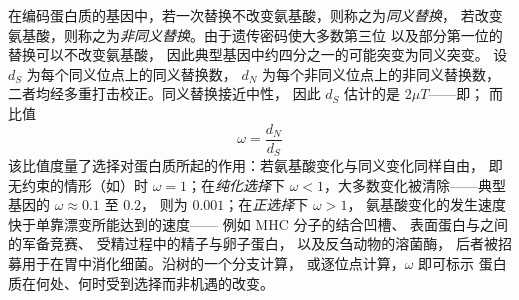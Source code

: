 \begin{definition}[dN/dS]\label{def:b3:molecular-evolution:dnds}
在编码蛋白质的基因中，若一次替换不改变氨基酸，则称之为\emph{同义替换}，
若改变氨基酸，则称之为\emph{非同义替换}。由于遗传密码使大多数第三位
以及部分第一位的替换可以不改变氨基酸，
因此典型基因中约四分之一的可能突变为同义突变。
设 $d_{S}$ 为每个同义位点上的同义替换数，
$d_{N}$ 为每个非同义位点上的非同义替换数，
二者均经多重打击校正。同义替换接近中性，
因此 $d_{S}$ 估计的是 $2\mu T$——即；
而比值
\[
\omega = \frac{d_{N}}{d_{S}}
\]
该比值度量了选择对蛋白质所起的作用：若氨基酸变化与同义变化同样自由，
即无约束的情形（如）时 $\omega = 1$；在\emph{纯化选择}下
$\omega < 1$，大多数变化被清除——典型基因的 $\omega \approx 0.1$ 至 $0.2$，
则为 $0.001$；在\emph{正选择}下 $\omega > 1$，
氨基酸变化的发生速度快于单靠漂变所能达到的速度——
例如 MHC 分子的结合凹槽、
表面蛋白与之间的军备竞赛、
受精过程中的精子与卵子蛋白，
以及反刍动物的溶菌酶，
后者被招募用于在胃中消化细菌。沿树的一个分支计算，
或逐位点计算，$\omega$ 即可标示
蛋白质在何处、何时受到选择而非机遇的改变。
\end{definition}

